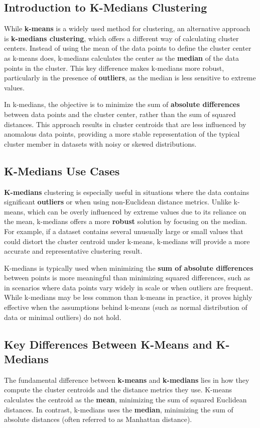 \subsection{Introduction to K-Medians Clustering}
    \large While \textbf{k-means} is a widely used method for clustering, an alternative approach is \textbf{k-medians clustering}, which offers a different way of calculating cluster centers. Instead of using the mean of the data points to define the cluster center as k-means does, k-medians calculates the center as the \textbf{median} of the data points in the cluster. This key difference makes k-medians more robust, particularly in the presence of \textbf{outliers}, as the median is less sensitive to extreme values.
    
    In k-medians, the objective is to minimize the sum of \textbf{absolute differences} between data points and the cluster center, rather than the sum of squared distances. This approach results in cluster centroids that are less influenced by anomalous data points, providing a more stable representation of the typical cluster member in datasets with noisy or skewed distributions.

\subsection{K-Medians Use Cases}
    \large \textbf{K-medians} clustering is especially useful in situations where the data contains significant \textbf{outliers} or when using non-Euclidean distance metrics. Unlike k-means, which can be overly influenced by extreme values due to its reliance on the mean, k-medians offers a more \textbf{robust} solution by focusing on the median. For example, if a dataset contains several unusually large or small values that could distort the cluster centroid under k-means, k-medians will provide a more accurate and representative clustering result.

    K-medians is typically used when minimizing the \textbf{sum of absolute differences} between points is more meaningful than minimizing squared differences, such as in scenarios where data points vary widely in scale or when outliers are frequent. While k-medians may be less common than k-means in practice, it proves highly effective when the assumptions behind k-means (such as normal distribution of data or minimal outliers) do not hold.

\subsection{Key Differences Between K-Means and K-Medians}
    \large The fundamental difference between \textbf{k-means} and \textbf{k-medians} lies in how they compute the cluster centroids and the distance metrics they use. K-means calculates the centroid as the \textbf{mean}, minimizing the sum of squared Euclidean distances. In contrast, k-medians uses the \textbf{median}, minimizing the sum of absolute distances (often referred to as Manhattan distance).


